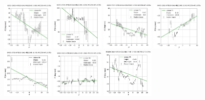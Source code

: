 \documentclass[fleqn,usenatbib]{mnras}
\begin{document}
\begin{figure}
    \includegraphics[width=0.23\textwidth]{Images/LINFITS/CC1-8252-1902-LINFIT-EBARS-MASKED.png}
    \includegraphics[width=0.23\textwidth]{Images/LINFITS/CC1-8255-3704-LINFIT-EBARS-MASKED.png}
    \includegraphics[width=0.23\textwidth]{Images/LINFITS/CC1-8456-3703-LINFIT-EBARS-MASKED.png}
    \includegraphics[width=0.23\textwidth]{Images/LINFITS/CC1-8465-1902-LINFIT-EBARS-MASKED.png}
    \includegraphics[width=0.23\textwidth]{Images/LINFITS/CC1-8465-3703-LINFIT-EBARS-MASKED.png}
    \includegraphics[width=0.23\textwidth]{Images/LINFITS/CC1-8465-9101-LINFIT-EBARS-MASKED.png}
    \includegraphics[width=0.23\textwidth]{Images/LINFITS/CC1-8548-6104-LINFIT-EBARS-MASKED.png}

\end{figure}
\end{document}
